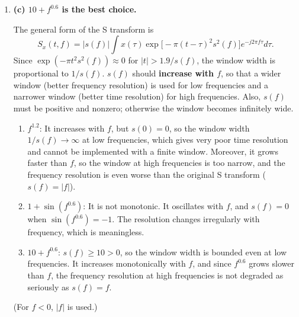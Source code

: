 \documentclass[12pt,a4paper]{article}
\begin{document}
\begin{enumerate}
\begin{enumerate}[label=(\alph*)]
  In the generalized spectrogram, $w_1$ can be chosen as a \textbf{wider} window (concentrated along the $f$-axis) and $w_2$ as a \textbf{narrower} window (concentrated along the $t$-axis). The product is large only where both are large, so \textbf{both the time and the frequency resolution are improved}, i.e., higher clarity than the Gabor transform with any single $\sigma$.

  Moreover, it is the product of two linear transforms, so there are no serious cross terms as in the WDF, and the cost is only two Gabor transforms. It can be further generalized as $G^{\alpha}_{x,w_1}\overline{G^{\beta}_{x,w_2}}$ or $|G_{x,w_1}|^{\alpha}|G_{x,w_2}|^{\beta}$ to adjust the weights.
\end{enumerate}

\item \textbf{(c) $10+f^{0.6}$ is the best choice.}

The general form of the S transform is
\[
S_x(t,f)=|s(f)|\int x(\tau)\exp\!\big[-\pi(t-\tau)^2s^2(f)\big]e^{-j2\pi f\tau}d\tau .
\]
Since $\exp(-\pi t^2s^2(f))\approx0$ for $|t|>1.9/s(f)$, the window width is proportional to $1/s(f)$. $s(f)$ should \textbf{increase with $f$}, so that a wider window (better frequency resolution) is used for low frequencies and a narrower window (better time resolution) for high frequencies. Also, $s(f)$ must be positive and nonzero; otherwise the window becomes infinitely wide.
\begin{enumerate}[label=(\alph*)]
  \item $f^{1.2}$: It increases with $f$, but $s(0)=0$, so the window width $1/s(f)\to\infty$ at low frequencies, which gives very poor time resolution and cannot be implemented with a finite window. Moreover, it grows faster than $f$, so the window at high frequencies is too narrow, and the frequency resolution is even worse than the original S transform ($s(f)=|f|$).
  \item $1+\sin(f^{0.6})$: It is not monotonic. It oscillates with $f$, and $s(f)=0$ when $\sin(f^{0.6})=-1$. The resolution changes irregularly with frequency, which is meaningless.
  \item $10+f^{0.6}$: $s(f)\ge10>0$, so the window width is bounded even at low frequencies. It increases monotonically with $f$, and since $f^{0.6}$ grows slower than $f$, the frequency resolution at high frequencies is not degraded as seriously as $s(f)=f$.
\end{enumerate}
(For $f<0$, $|f|$ is used.)


\end{enumerate}
\end{document}
